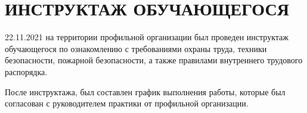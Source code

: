 \section{ИНСТРУКТАЖ ОБУЧАЮЩЕГОСЯ}

22.11.2021 на территории профильной организации был проведен инструктаж обучающегося по ознакомлению с требованиями охраны труда,
техники безопасности, пожарной безопасности, а также правилами внутреннего трудового распорядка.

После инструктажа, был составлен график выполнения работы, которые был согласован с руководителем практики от профильной организации.